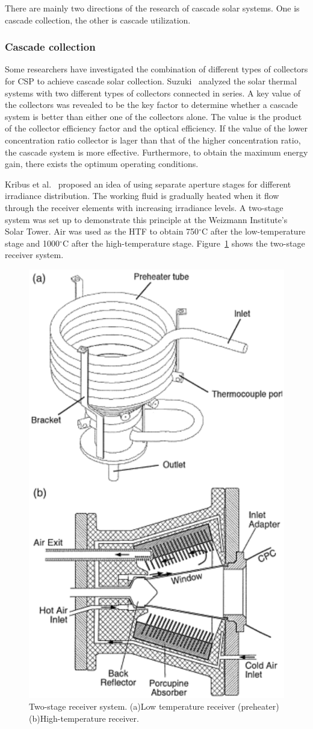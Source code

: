 There are mainly two directions of the research of cascade solar systems. One is cascade collection, the other is cascade utilization.

\subsubsection{Cascade collection}

Some researchers have investigated the combination of different types of collectors for CSP to achieve cascade solar collection.
Suzuki~\cite{Suzuki1986} analyzed the solar thermal systems with two different types of collectors connected in series. A key value of the collectors was revealed to be the key factor to determine whether a cascade system is better than either one of the collectors alone. The value is the product of the collector efficiency factor and the optical efficiency. If the value of the lower concentration ratio collector is lager than that of the higher concentration ratio, the cascade system is more effective. Furthermore, to obtain the maximum energy gain, there exists the optimum operating conditions.

Kribus et al.~\cite{Kribus1999} proposed an idea of using separate aperture stages for different irradiance distribution. The working fluid is gradually heated when it flow through the receiver elements with increasing irradiance levels. A two-stage system was set up to demonstrate this principle at the Weizmann Institute's Solar Tower. Air was used as the HTF to obtain 750$\mathrm{^\circ C}$ after the low-temperature stage and 1000$\mathrm{^\circ C}$ after the high-temperature stage. Figure~\ref{fig:Kribus1999} shows the two-stage receiver system.

\begin{figure}[!ht]
\centering
\includegraphics[width=.6\textwidth]{fig/Kribus1999.pdf}
\caption{Two-stage receiver system. (a)Low temperature receiver (preheater) (b)High-temperature receiver.}\label{fig:Kribus1999}
\end{figure}

